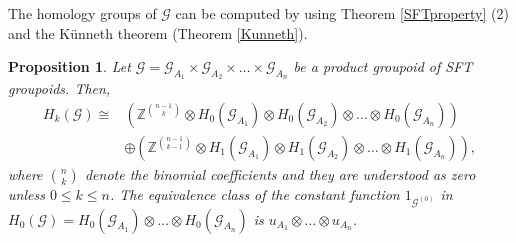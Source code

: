 \documentclass[11pt]{article}
\newtheorem{proposition}[theorem]{Proposition}
\theoremstyle{definition}
\numberwithin{equation}{section}
\newcommand{\G}{\mathcal{G}}
\newcommand{\Z}{\mathbb{Z}}
\begin{document}
The homology groups of $\G$ can be computed 
by using Theorem \ref{SFTproperty} (2) and 
the K\"unneth theorem (Theorem \ref{Kunneth}). 

\begin{proposition}\label{prodSFTH_k}
Let $\G=\G_{A_1}\times\G_{A_2}\times\dots\times\G_{A_n}$ be 
a product groupoid of SFT groupoids. 
Then, 
\begin{align*}
H_k(\G)\cong&\left(\Z^{\binom{n-1}{k}}
\otimes H_0(\G_{A_1})\otimes H_0(\G_{A_2})\otimes
\dots\otimes H_0(\G_{A_n})\right)\\
&\oplus\left(\Z^{\binom{n-1}{k-1}}
\otimes H_1(\G_{A_1})\otimes H_1(\G_{A_2})\otimes
\dots\otimes H_1(\G_{A_n})\right), 
\end{align*}
where $\binom{n}{k}$ denote the binomial coefficients and 
they are understood as zero unless $0\leq k\leq n$. 
The equivalence class of the constant function $1_{\G^{(0)}}$ 
in $H_0(\G)=H_0(\G_{A_1})\otimes\dots\otimes H_0(\G_{A_n})$ 
is $u_{A_1}\otimes\dots\otimes u_{A_n}$. 
\end{proposition}
\end{document}
